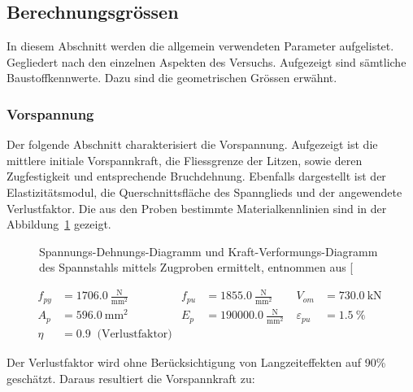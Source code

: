\documentclass[
  11pt,
  letterpaper,
]{scrreprt}
\begin{document}
\subsection{Berechnungsgrössen}\label{berechnungsgruxf6ssen}

In diesem Abschnitt werden die allgemein verwendeten Parameter
aufgelistet. Gegliedert nach den einzelnen Aspekten des Versuchs.
Aufgezeigt sind sämtliche Baustoffkennwerte. Dazu sind die geometrischen
Grössen erwähnt.

\subsubsection{Vorspannung}\label{vorspannung}

Der folgende Abschnitt charakterisiert die Vorspannung. Aufgezeigt ist
die mittlere initiale Vorspannkraft, die Fliessgrenze der Litzen, sowie
deren Zugfestigkeit und entsprechende Bruchdehnung. Ebenfalls
dargestellt ist der Elastizitätsmodul, die Querschnittsfläche des
Spannglieds und der angewendete Verlustfaktor. Die aus den Proben
bestimmte Materialkennlinien sind in der
Abbildung~\ref{fig-sigma_eps_spannstahl} gezeigt.

\begin{figure}[H]


\caption{\label{fig-sigma_eps_spannstahl}Spannungs-Dehnungs-Diagramm und
Kraft-Verformungs-Diagramm des Spannstahls mittels Zugproben ermittelt,
entnommen aus {[}\citeproc{ref-sigrist_versuche_1993}{5}{]}}

\end{figure}%

$$
\begin{aligned}
f_{py} &= 1706.0\ \frac{\mathrm{N}}{\mathrm{mm}^{2}} \; 
 &f_{pu} &= 1855.0\ \frac{\mathrm{N}}{\mathrm{mm}^{2}} \; 
 &V_{om} &= 730.0\ \mathrm{kN} \; 
\\[11pt]
 A_{p} &= 596.0\ \mathrm{mm}^{2} \; 
 &E_{p} &= 190000.0\ \frac{\mathrm{N}}{\mathrm{mm}^{2}} \; 
 &\varepsilon_{pu} &= 1.5\ \mathrm{\%} \; 
\\[11pt]
 \eta &= 0.9 \; \;\textrm{(Verlustfaktor)}
\end{aligned}
$$

Der Verlustfaktor wird ohne Berücksichtigung von Langzeiteffekten auf
90\% geschätzt. Daraus resultiert die Vorspannkraft zu:
\end{document}
